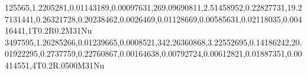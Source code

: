 125565,1.2205281,0.01143189,0.00097631,269.09690811,2.51458952,0.22827731,19.27131441,0.26321728,0.20238462,0.0026469,0.01128669,0.00585631,0.02118035,0.00416441,1T0.2R0.2M31Nu
3497595,1.26285266,0.01239665,0.0008521,342.26360868,3.22552695,0.14186242,20.01922295,0.2737759,0.22760867,0.00164638,0.00792724,0.00612821,0.01887351,0.00414551,4T0.2R.0500M31Nu
